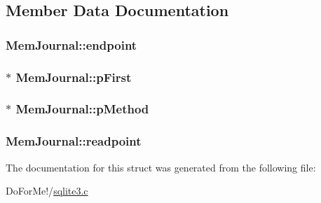\subsection{Member Data Documentation}
\hypertarget{struct_mem_journal_ac69637f95cfbce175cbeef00f71e59a9}{
\subsubsection[{endpoint}]{ Mem\-Journal\-::endpoint}}\label{struct_mem_journal_ac69637f95cfbce175cbeef00f71e59a9}
\hypertarget{struct_mem_journal_ade7a6dea7b38a8a86f33476ae207765f}{
\subsubsection[{p\-First}]{$\ast$ Mem\-Journal\-::p\-First}}\label{struct_mem_journal_ade7a6dea7b38a8a86f33476ae207765f}
\hypertarget{struct_mem_journal_a00c1523cce1bcfadc2b672b8703a78cb}{
\subsubsection[{p\-Method}]{$\ast$ Mem\-Journal\-::p\-Method}}\label{struct_mem_journal_a00c1523cce1bcfadc2b672b8703a78cb}
\hypertarget{struct_mem_journal_a5645d38e1a488b62b5f63112628bf472}{
\subsubsection[{readpoint}]{ Mem\-Journal\-::readpoint}}\label{struct_mem_journal_a5645d38e1a488b62b5f63112628bf472}


The documentation for this struct was generated from the following file\-:\begin{DoxyCompactItemize}
\item 
Do\-For\-Me!/\hyperlink{sqlite3_8c}{sqlite3.\-c}\end{DoxyCompactItemize}
